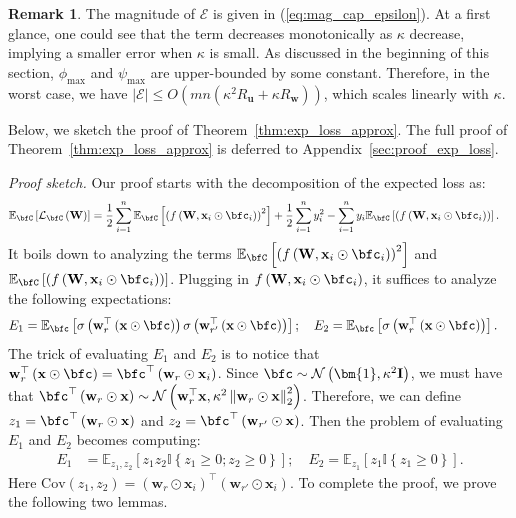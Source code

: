 \documentclass[10pt]{article} %
\theoremstyle{definition}
\newtheorem{remark}[theorem]{Remark}
\theoremstyle{plain}
\newcommand{\paren}[1]{\left(#1\right)}
\newcommand{\norm}[1]{\left\|#1\right\|}
\newcommand{\indy}[1]{\mathbb{I}\left\{#1\right\}}
\providecommand{\E}{\mathbb{E}}
\def\calL{{\mathcal{L}}}
\def\bfI{{\mathbf{I}}}\def\bfJ{{\mathbf{J}}}\def\bfK{{\mathbf{K}}}\def\bfL{{\mathbf{L}}}
\def\bfu{{\mathbf{u}}}\def\bfv{{\mathbf{v}}}\def\bfw{{\mathbf{w}}}\def\bfx{{\mathbf{x}}}
\begin{document}
\begin{remark}
The magnitude of $\mathcal{E}$ is given in (\ref{eq:mag_cap_epsilon}). At a first glance, one could see that the term decreases monotonically as $\kappa$ decrease, implying a smaller error when $\kappa$ is small. As discussed in the beginning of this section, $\phi_{\max}$ and $\psi_{\max}$ are upper-bounded by some constant. Therefore, in the worst case, we have $\left|\mathcal{E}\right|\leq O\paren{mn\paren{\kappa^2R_{\bfu} + \kappa R_{\bfw}}}$, which scales linearly with $\kappa$. 
\end{remark}

Below, we sketch the proof of Theorem~\ref{thm:exp_loss_approx}. The full proof of Theorem~\ref{thm:exp_loss_approx} is deferred to Appendix~\ref{sec:proof_exp_loss}.

\textit{Proof sketch.} Our proof starts with the decomposition of the expected loss as:
\begin{align*}
\E_{\bfC}\left[\calL_{\bfC}\paren{\mathbf{W}}\right] & = \frac{1}{2}\sum_{i=1}^n\E_{\bfC}\left[\paren{f\paren{\mathbf{W},\bfx_i\odot\bfc_i}}^2\right]+ \frac{1}{2}\sum_{i=1}^ny_i^2 
    - \sum_{i=1}^ny_i\E_{\bfC}\left[\paren{f\paren{\mathbf{W},\bfx_i\odot\bfc_i}}\right].
\end{align*}
It boils down to analyzing the terms $\E_{\bfC}\left[\paren{f\paren{\mathbf{W},\bfx_i\odot\bfc_i}}^2\right]$ and $\E_{\bfC}\left[\paren{f\paren{\mathbf{W},\bfx_i\odot\bfc_i}}\right]$. 
Plugging in $f\paren{\mathbf{W},\bfx_i\odot\bfc_i}$, it suffices to analyze the following expectations:
\begin{align*}
    E_1 &= \E_{\bfc}\left[\sigma\paren{\bfw_r^\top\paren{\bfx\odot\bfc}}\sigma\paren{\bfw_{r'}^\top\paren{\bfx\odot\bfc}}\right];\quad E_2= \E_{\bfc}\left[\sigma\paren{\bfw_r^\top\paren{\bfx\odot\bfc}}\right].
\end{align*}
The trick of evaluating $E_1$ and $E_2$ is to notice that $\bfw_r^\top\paren{\bfx\odot\bfc} = \bfc^\top\paren{\bfw_r\odot\bfx_i}$. Since $\bfc\sim\mathcal{N}\paren{\bm{1},\kappa^2\bfI}$, we must have that $\bfc^\top\paren{\bfw_r\odot\bfx}\sim\mathcal{N}\paren{\bfw_r^\top\bfx,\kappa^2\norm{\bfw_r\odot\bfx}_2^2}$. Therefore, we can define $z_1 = \bfc^\top\paren{\bfw_r\odot\bfx}$ and $z_2 = \bfc^\top\paren{\bfw_{r'}\odot\bfx}$. Then the problem of evaluating $E_1$ and $E_2$ becomes computing:
\begin{align*}
    E_1 &= \E_{z_1,z_2}\left[z_1z_2\indy{z_1\geq 0;z_2\geq 0}\right];\quad E_2= \E_{z_1}\left[z_1\indy{z_1\geq 0}\right].
\end{align*}
Here $\text{Cov}\paren{z_1, z_2} = \paren{\bfw_r\odot\bfx_i}^\top\paren{\bfw_{r'}\odot\bfx_i}$. To complete the proof, we prove the following two lemmas.
\end{document}
